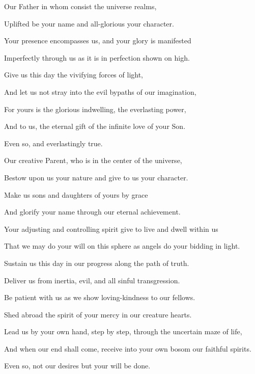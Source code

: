 \begin{quoting}[vskip=\baselineskip,leftmargin=4ex,rightmargin=2ex]
\setlength{\parindent}{-0.7em}
\hspace*{-1.2em}
Our Father in whom consist the universe realms,\par
Uplifted be your name and all\hyp{}glorious your character.\par
Your presence encompasses us, and your glory is manifested\par
Imperfectly through us as it is in perfection shown on high.\par
Give us this day the vivifying forces of light,\par
And let us not stray into the evil bypaths of our imagination,\par
For yours is the glorious indwelling, the everlasting power,\par
And to us, the eternal gift of the infinite love of your Son.\par
Even so, and everlastingly true.\par
\end{quoting}
\separatorshort
\begin{quoting}[vskip=\baselineskip,leftmargin=4ex,rightmargin=2ex]
\setlength{\parindent}{-0.7em}
\hspace*{-1.2em}
Our creative Parent, who is in the center of the universe,\par
Bestow upon us your nature and give to us your character.\par
Make us sons and daughters of yours by grace\par
And glorify your name through our eternal achievement.\par
Your adjusting and controlling spirit give to live and dwell within us\par
That we may do your will on this sphere as angels do your bidding in light.\par
Sustain us this day in our progress along the path of truth.\par
Deliver us from inertia, evil, and all sinful transgression.\par
Be patient with us as we show loving\hyp{}kindness to our fellows.\par
Shed abroad the spirit of your mercy in our creature hearts.\par
Lead us by your own hand, step by step, through the uncertain maze of life,\par
And when our end shall come, receive into your own bosom our faithful spirits.\par
Even so, not our desires but your will be done.\par
\end{quoting}
